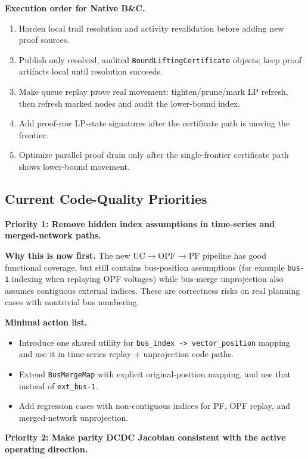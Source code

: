 \textbf{Execution order for Native B\&C.}
\begin{enumerate}
  \item Harden local trail resolution and activity revalidation before adding
    new proof sources.
  \item Publish only resolved, audited \texttt{BoundLiftingCertificate} objects;
    keep proof artifacts local until resolution succeeds.
  \item Make queue replay prove real movement: tighten/prune/mark LP refresh,
    then refresh marked nodes and audit the lower-bound index.
  \item Add proof-row LP-state signatures after the certificate path is
    moving the frontier.
  \item Optimize parallel proof drain only after the single-frontier
    certificate path shows lower-bound movement.
\end{enumerate}

\subsection{Current Code-Quality Priorities}

\textbf{Priority 1: Remove hidden index assumptions in time-series and merged-network paths.}

\textbf{Why this is now first.} The new UC\(\rightarrow\)OPF\(\rightarrow\)PF pipeline has
good functional coverage, but still contains bus-position assumptions (for example
\texttt{bus-1} indexing when replaying OPF voltages) while bus-merge unprojection also
assumes contiguous external indices. These are correctness risks on real planning
cases with nontrivial bus numbering.

\textbf{Minimal action list.}
\begin{itemize}
  \item Introduce one shared utility for \texttt{bus\_index -> vector\_position} mapping and use it in time-series replay + unprojection code paths.
  \item Extend \texttt{BusMergeMap} with explicit original-position mapping, and use that instead of \texttt{ext\_bus-1}.
  \item Add regression cases with non-contiguous indices for PF, OPF replay, and merged-network unprojection.
\end{itemize}

\textbf{Priority 2: Make parity DCDC Jacobian consistent with the active operating direction.}

